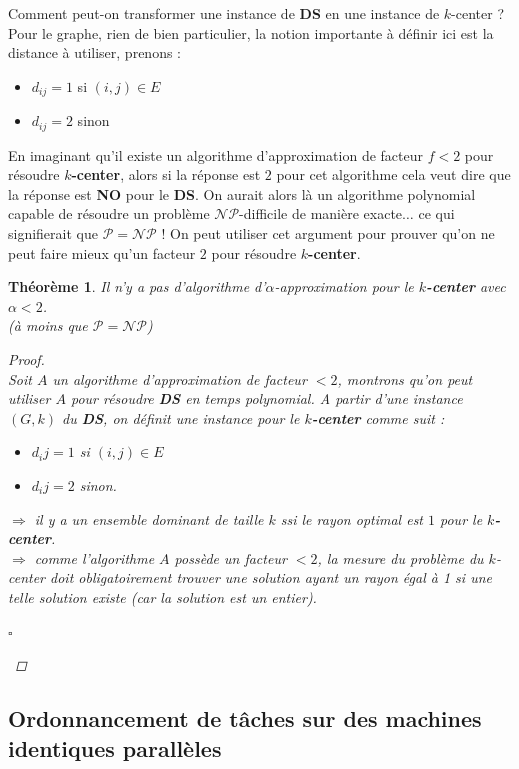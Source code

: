 \documentclass[12pt]{article}
\newcommand{\titre}[1]{\textcolor{title}{#1}}
\newcommand{\cqfd}{\begin{flushright}$\square$\end{flushright}}
\newtheorem{thm}{Th\'eor\`eme}[section]
\newtheorem{proof}{Preuve}[section]
\begin{document}
Comment peut-on transformer une instance de \textbf{\titre{DS}} en une instance de $k$-center ? Pour le graphe, rien de bien particulier,
la notion importante à définir ici est la distance à utiliser, prenons :
\begin{itemize}
\item $d_{ij} = 1$ si $(i,j) \in E$
\item $d_{ij} = 2$ sinon \\
\end{itemize}

En imaginant qu'il existe un algorithme d'approximation de facteur $f < 2$ pour résoudre \textbf{$k$-center}, alors si la réponse est $2$
pour cet algorithme cela veut dire que la réponse est \textbf{NO} pour le \textbf{\titre{DS}}. On aurait alors là un algorithme
polynomial capable de résoudre un problème $\mathcal{NP}$-difficile de manière exacte$\ldots$ ce qui signifierait que $\mathcal{P=NP}$ !
On peut utiliser cet argument pour prouver qu'on ne peut faire mieux qu'un facteur $2$ pour résoudre \textbf{$k$-center}.

\begin{thm}Il n'y a pas d'algorithme d'$\alpha$-approximation pour le \textbf{$k$-center} avec $\alpha <2$.\\ (à moins que $\mathcal{P} =
\mathcal{NP}$)
\begin{proof}$ $\\
Soit $A$ un algorithme d'approximation de facteur $<2$, montrons qu'on peut utiliser $A$ pour résoudre \textbf{\titre{DS}} en temps
polynomial. A partir d'une instance $(G,k)$ du \textbf{\titre{DS}}, on définit une instance pour le \textbf{$k$-center} comme suit :
\begin{itemize}
\item [$\bigstar$]$d_ij = 1$ si $(i,j) \in E$
\item [$\bigstar$]$d_ij = 2$ sinon.
\end{itemize}
$\Rightarrow$ il y a un ensemble dominant de taille $k$ ssi le rayon optimal est $1$ pour le \textbf{$k$-center}.\\
$\Rightarrow$ comme l'algorithme $A$ possède un facteur $< 2$, la mesure du problème du $k$-center doit obligatoirement trouver une
solution ayant un rayon égal à 1 si une telle solution existe \textit{(car la solution est un entier)}.
\cqfd
\end{proof}
\end{thm}



\subsection{Ordonnancement de tâches sur des machines identiques parallèles}
\end{document}
